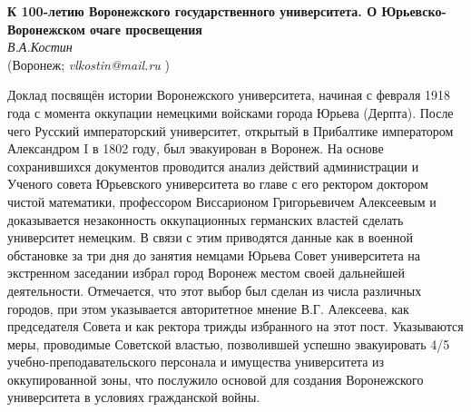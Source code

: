\begin{center}{ \bf  К 100-летию Воронежского государственного университета. О Юрьевско-Воронежском очаге просвещения}\\
{\it В.А.Костин } \\
(Воронеж; {\it vlkostin@mail.ru} )\\
\end{center}

Доклад посвящён истории Воронежского университета,
начиная с февраля 1918 года с момента оккупации немецкими войсками города Юрьева (Дерпта).
После чего Русский императорский университет, открытый в Прибалтике императором Александром I в 1802 году,
был эвакуирован в Воронеж.
На основе сохранившихся документов проводится анализ действий администрации и Ученого совета Юрьевского университета во главе с его ректором доктором чистой математики, профессором Виссарионом Григорьевичем Алексеевым и доказывается незаконность оккупационных германских властей сделать университет немецким. В связи с этим приводятся данные как в военной обстановке за три дня до занятия немцами Юрьева Совет университета на экстренном заседании избрал город Воронеж местом своей дальнейшей деятельности. Отмечается, что этот выбор был сделан из числа различных городов, при этом указывается авторитетное мнение В.Г.  Алексеева, как председателя Совета и как ректора трижды избранного на этот пост. Указываются меры, проводимые Советской властью, позволившей успешно эвакуировать 4/5 учебно-преподавательского персонала и имущества университета из оккупированной зоны, что послужило основой для создания Воронежского университета в условиях гражданской войны.


